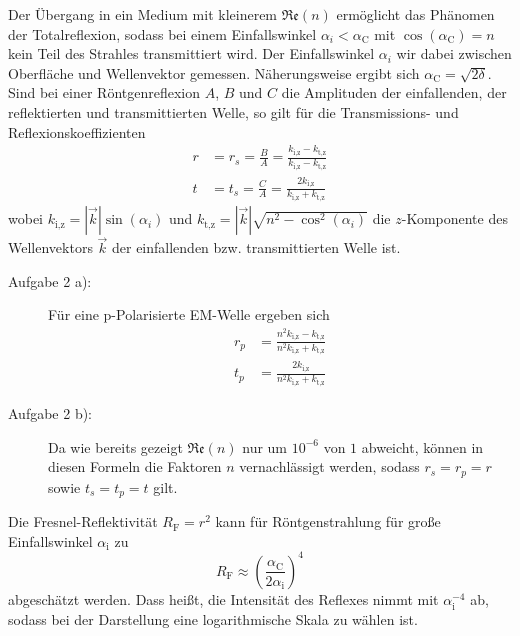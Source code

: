 Der Übergang in ein Medium mit kleinerem $\mathfrak{Re}(n)$ ermöglicht das Phänomen der
Totalreflexion, sodass bei einem Einfallswinkel $\alpha_i < \alpha_\text{C}$ mit
$\cos(\alpha_\text{C})=n$ kein Teil des Strahles transmittiert wird. Der
Einfallswinkel $\alpha_i$ wir dabei zwischen Oberfläche und Wellenvektor gemessen.
Näherungsweise ergibt sich $\alpha_\text{C}=\sqrt{2\delta}$.\\
Sind bei einer Röntgenreflexion $A$, $B$ und $C$ die Amplituden der
einfallenden, der reflektierten und transmittierten Welle, so gilt für die
Transmissions- und Reflexionskoeffizienten
\begin{align}
r&=r_s=\frac{B}{A}=\frac{k_\text{i,z}-k_\text{t,z}}{k_\text{i,z}-k_\text{t,z}} \label{eq:r} \\
t&=t_s=\frac{C}{A}= \frac{2 k_\text{i,z}}{k_\text{i,z}+k_\text{t,z}}
\end{align}
wobei $k_\text{i,z}=|\vec{k}|\sin(\alpha_i)$ und $k_\text{t,z}=|
\vec{k}|\sqrt{n^2-\cos^2(\alpha_i)}$ die $z$-Komponente des
Wellenvektors
$\vec{k}$ der einfallenden
bzw. transmittierten Welle ist.
\begin{description}
\item[Aufgabe 2 a):]
Für eine p-Polarisierte EM-Welle ergeben sich
\begin{align}
r_p&= \frac{n^2 k_\text{i,z}-k_\text{t,z}}{n^2 k_\text{i,z}+k_\text{t,z}} \\
t_p&=\frac{2k_\text{i,z}}{n^2 k_\text{i,z}+k_\text{t,z}}
\end{align}
\item[Aufgabe 2 b):]
Da wie bereits gezeigt $\mathfrak{Re}(n)$ nur um $10^{-6}$ von $1$ abweicht, können in
diesen Formeln die Faktoren $n$ vernachlässigt werden, sodass $r_s=r_p=r$ sowie
$t_s=t_p=t$ gilt.
\end{description}
Die Fresnel-Reflektivität $R_\text{F}=r^2$ kann für Röntgenstrahlung für große
Einfallswinkel $\alpha_\text{i}$ zu
\begin{equation}
R_\text{F}\approx \left( \frac{\alpha_\text{C}}{2\alpha_\text{i}} \right)^4 \label{eq:Reflekt4}
\end{equation}
abgeschätzt werden. Dass heißt, die Intensität des Reflexes nimmt mit
$\alpha_\text{i}^{-4}$ ab, sodass bei der Darstellung eine logarithmische Skala
zu wählen ist.
